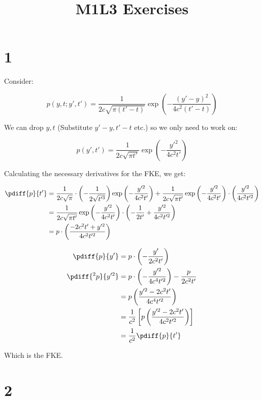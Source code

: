 \documentclass{article}
\begin{document}
	\title{M1L3 Exercises}
	\maketitle
	\section*{1}
	Consider:
	
	\begin{equation*}
		p(y,t;y',t') = \frac{1}{2c\sqrt{\pi(t'-t)}}\exp\left(-\frac{(y'-y)^2}{4c^2(t'-t)}\right)
	\end{equation*}
	
	We can drop $y,t$ (Substitute $y'-y,t'-t$ etc.) so we only need to work on:
	
	\begin{equation*}
		p(y',t') = \frac{1}{2c\sqrt{\pi t'}}\exp\left(-\frac{y'^2}{4c^2 t'}\right)
	\end{equation*}
	
	Calculating the necessary derivatives for the FKE, we get:
	
	\begin{align*}
		\pdiff{p}{t'} &= \frac{1}{2c\sqrt{\pi}} \cdot \left(-\frac{1}{2\sqrt{t'^3}}\right)\exp\left(-\frac{y'^2}{4c^2 t'}\right) + \frac{1}{2c\sqrt{\pi t'}}\exp\left(-\frac{y'^2}{4c^2 t'}\right) \cdot \left(\frac{y'^2}{4c^2t'^2}\right) \\
		&= \frac{1}{2c\sqrt{\pi t'}}\exp\left(-\frac{y'^2}{4c^2 t'}\right) \cdot \left(-\frac{1}{2t'} + \frac{y'^2}{4c^2t'^2}\right) \\
		&= p \cdot \left(\frac{-2c^2t'+y'^2}{4c^2t'^2}\right)
	\end{align*}
	
	\begin{align*}
		\pdiff{p}{y'} &= p \cdot \left(-\frac{y'}{2c^2t'}\right) \\
		\pdiff{^2p}{y'^2} &= p \cdot \left(-\frac{y'^2}{4c^4t'^2}\right) - \frac{p}{2c^2t'} \\
		&= p \left(\frac{y'^2-2c^2t'}{4c^4t'^2}\right) \\
		&= \frac{1}{c^2} 
		\left[p \left( \frac{y'^2-2c^2t'}{4c^2t'^2} \right)\right] \\
		&= \frac{1}{c^2} \pdiff{p}{t'}
	\end{align*}
	
	Which is the FKE.
	\section*{2}
	
\end{document}
